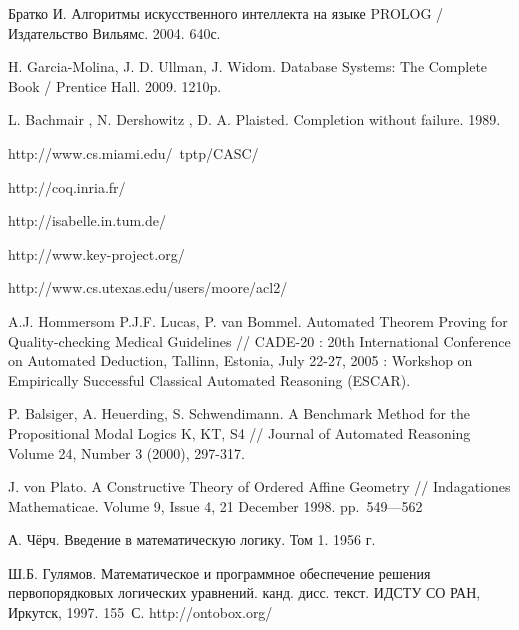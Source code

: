 \begin{thebibliography}{99}
 Братко И. Алгоритмы искусственного интеллекта на языке PROLOG / Издательство Вильямс. 2004. 640с.

 H. Garcia-Molina, J. D. Ullman, J. Widom. Database Systems: The Complete Book / Prentice Hall. 2009. 1210p.

  L. Bachmair , N. Dershowitz , D. A. Plaisted. Completion without failure. 1989.

 http://www.cs.miami.edu/~tptp/CASC/

 http://coq.inria.fr/

 http://isabelle.in.tum.de/


 http://www.key-project.org/

 http://www.cs.utexas.edu/users/moore/acl2/



 A.J. Hommersom P.J.F. Lucas, P. van Bommel. Automated Theorem Proving for Quality-checking Medical Guidelines // CADE-20 : 20th International Conference on Automated Deduction, Tallinn, Estonia, July 22-27, 2005 : Workshop on Empirically Successful Classical Automated Reasoning (ESCAR).

 P. Balsiger, A. Heuerding, S. Schwendimann. A Benchmark Method for the Propositional Modal Logics K, KT, S4 // Journal of Automated Reasoning Volume 24, Number 3 (2000), 297-317.

 J. von Plato. A Constructive Theory of Ordered Affine Geometry // Indagationes Mathematicae. Volume 9, Issue 4, 21 December 1998. pp.~549---562

 А. Чёрч. Введение в математическую логику. Том 1. 1956 г.

 Ш.Б. Гулямов. Математическое и программное обеспечение решения первопорядковых логических уравнений. канд. дисс. текст. ИДСТУ СО РАН, Иркутск, 1997. 155~С.
 http://ontobox.org/

\end{thebibliography}



